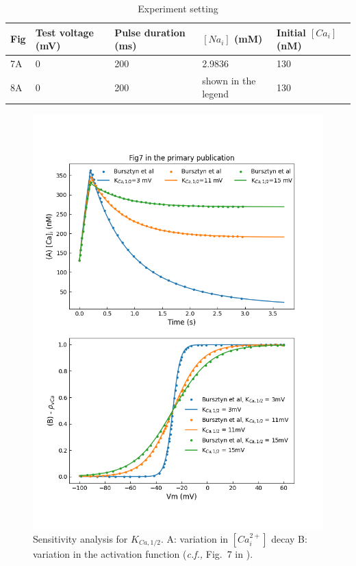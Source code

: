 \documentclass[fleqn,10pt]{physiome}
\begin{document}
\begin{table}[hbt!]\centering
\caption{Experiment setting}\label{tab:clamp2}
\begin{tabularx}{\textwidth}{m{1cm}m{2.6cm}m{3cm}m{3cm}X}
\toprule
Fig &  Test voltage (mV) &  Pulse duration (ms)& $[Na_i]$ (mM) & Initial $[Ca_i]$ (nM)\\
\midrule
7A & 0  & 200  & 2.9836 & 130 \\
8A & 0 & 200  & shown in the legend & 130\\
\bottomrule
\end{tabularx}
\end{table}

\begin{figure}
\centering
\begin{minipage}[t]{\dimexpr.5\textwidth-0.3em}
  \centering
 \includegraphics[width=0.9\linewidth]{./figs/simFig7.png}
  \caption{Sensitivity analysis for $K_{Ca,1/2}$. A: variation in $[Ca_{i}^{2+}]$ decay B: variation in the activation function (\emph{c.f.,} Fig.~7 in \citet{bursztyn2007mathematical}).}

\end{minipage}
\end{figure}
\end{document}
